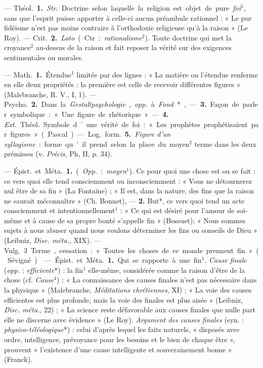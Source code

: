 \begin{itemize}[leftmargin=1cm, label=, itemsep=1pt]
 —  \si{Théol.} {\bf 1.} {\it Str.} Doctrine
selon laquelle la religion est objet
de pure {\it foi}$^5$, sans que l'esprit puisse
apporter à celle-ci aucun préambule rationnel : « Le pur fidéisme
n’est pas moins contraire à l'orthodoxie religieuse qu'à la raison » (Le
Roy). — \si{Crit.} {\bf 2.} {\it Lato} (Ctr. : {\it rationalisme}$^2$).
Toute doctrine qui met la croyance$^2$ au-dessus de la raison
et fait reposer la vérité sur des exigences sentimentales ou morales.

 — \si{Math.} {\bf 1.} Étendue$^1$ limitée par des lignes : « La
matière ou l'étendue renferme en elle deux propriétés : la première est celle
de recevoir différentes figures » (Malebranche, R. V., I, 1). — \si{Psycho.}
{\bf 2.} Dans la {\it Gestaltpsychologie}, {\it opp.} à {\it Fond}*, — {\bf 3.}
Façon de parler symbolique : « Une figure de rhétorique ». — {\bf 4.} {\it
Ext.} \si{Théol.} Symbole d’une vérité de foi : « Les prophètes prophétisaient
par figures » (Pascal).

— \si{Log.} \si{form.} {\bf 5.} {\it Figure d’un syllogisme} : forme qu'il
prend selon la place du moyen$^2$ terme dans les deux prémisses
(v. {\it Précis}, Ph, II, p. 34).

 — \si{Épist.} et \si{Méta.} {\bf 1.} ({\it Opp.} : {\it moyen}$^1$).
Ce pour quoi une chose est ou se fait ; ce vers quoi elle tend consciemment
ou inconsciemment : « Vous ne détournerez nul être de sa fin » (La
Fontaine) ; « Il est, dans la nature, des fins que la raison ne saurait
méconnaître » (Ch. Bonnet), — {\bf 2.} But*, ce vers quoi tend un
acte consciemment et intentionnellement$^1$ : « Ce qui est désiré pour
l'amour de soi-même et à cause de
sa propre bonté s’appelle fin » (Bossuet); « Nous sommes sujets à nous
abuser quand nous voulons déterminer les fins ou conseils de Dieu »
(Leibniz, {\it Disc. méta.}, XIX). — \si{Vulg.} 3 Terme, cessation :
« Toutes les choses de ce monde prennent fin » (Sévigné).

 — \si{Épist.} et \si{Méta.} {\bf 1.} Qui se rapporte à une fin$^1$.
{\it Cause finale} ({\it opp.} : {\it efficiente}*) : la fin$^1$ elle-même,
considérée comme la raison d’être de la chose (cf. {\it Cause}$^4$) : « La
connaissance des causes finales n’est pas nécessaire dans la physique »
(Malebranche, {\it Méditations chrétiennes}, XI) ; « La voie des causes
efficientes est plus profonde, mais la voie des finales est plus aisée »
(Leibniz, {\it Disc. méta.}, 22) ; « La science reste défavorable aux causes
finales que nulle part elle ne discerne avec évidence » (Le Roy).
{\it Argument des causes finales} (syn. : {\it physico-téléologique}*) :
celui d’après lequel les faits naturels, « disposés avec ordre, intelligence,
prévoyance pour les besoins et le bien de chaque être », prouvent
« l'existence d’une cause intelligente et souverainement bonne » (Franck).


\end{itemize}

